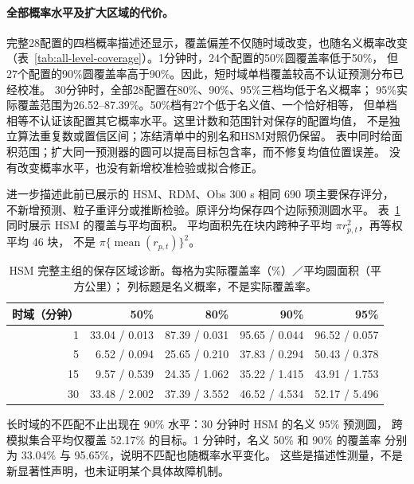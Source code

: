 \paragraph{全部概率水平及扩大区域的代价。}
完整28配置的四档概率描述还显示，覆盖偏差不仅随时域改变，也随名义概率改变
（表~\ref{tab:all-level-coverage}）。1分钟时，24个配置的50\%圆覆盖率低于50\%，
但27个配置的90\%圆覆盖率高于90\%。因此，短时域单档覆盖较高不认证预测分布已经校准。
30分钟时，全部28配置在80\%、90\%、95\%三档均低于名义概率；
95\%实际覆盖范围为26.52--87.39\%。50\%档有27个低于名义值、一个恰好相等，
但单档相等不认证该配置其它概率水平。这里计数和范围针对保存的配置均值，
不是独立算法重复数或置信区间；冻结清单中的别名和HSM对照仍保留。
表中同时给面积范围；扩大同一预测器的圆可以提高目标包含率，而不修复均值位置误差。
没有改变概率水平，也没有新增校准检验或拟合修正。

进一步描述此前已展示的 HSM、RDM、Obs 300 s 相同 690 项主要保存评分，
不新增预测、粒子重评分或推断检验。原评分均保存四个边际预测圆水平。
表~\ref{tab:full-calibration-area} 同时展示 HSM 的覆盖与平均面积。
平均面积先在块内跨种子平均 \(\pi r_{p,t}^2\)，再等权平均 46 块，
不是 \(\pi\{\operatorname{mean}(r_{p,t})\}^2\)。

\begin{table}[htbp]
\centering\small
\caption{HSM 完整主组的保存区域诊断。每格为实际覆盖率（\%）／平均圆面积（平方公里）；
列标题是名义概率，不是实际覆盖率。}
\label{tab:full-calibration-area}\hypertarget{tab:full-calibration-area}{}
\begin{tabular}{rrrrr}
\toprule
时域（分钟） & 50\% & 80\% & 90\% & 95\%\\
\midrule
1 & 33.04 / 0.013 & 87.39 / 0.031 & 95.65 / 0.044 & 96.52 / 0.057\\
5 & 6.52 / 0.094 & 25.65 / 0.210 & 37.83 / 0.294 & 50.43 / 0.378\\
15 & 9.57 / 0.539 & 24.35 / 1.062 & 35.22 / 1.415 & 43.91 / 1.753\\
30 & 33.48 / 2.002 & 37.39 / 3.552 & 46.52 / 4.534 & 52.17 / 5.496\\
\bottomrule
\end{tabular}
\end{table}

长时域的不匹配不止出现在 90\% 水平：30 分钟时 HSM 的名义 95\% 预测圆，
跨模拟集合平均仅覆盖 52.17\% 的目标。1 分钟时，名义 50\% 和 90\% 的覆盖率
分别为 33.04\% 与 95.65\%，说明不匹配也随概率水平变化。
这些是描述性测量，不是新显著性声明，也未证明某个具体故障机制。

